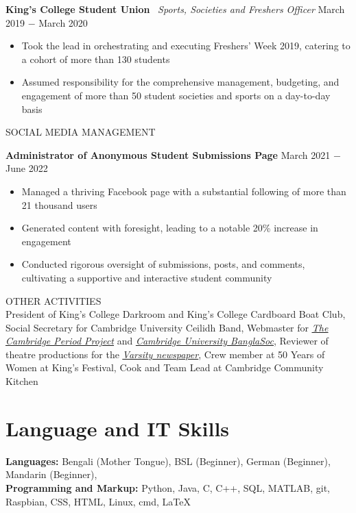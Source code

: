 \documentclass{article}
\begin{document}
\textbf{King's College Student Union} \
\textit{Sports, Societies and Freshers Officer }\hfill March 2019 $-$ March 2020
\begin{itemize}
    \item Took the lead in orchestrating and executing Freshers' Week 2019, catering to a cohort of more than 130 students
    \item Assumed responsibility for the comprehensive management, budgeting, and engagement of more than 50 student societies and sports on a day-to-day basis
\end{itemize} \medskip

\uppercase{Social Media Management}

\textbf{Administrator of Anonymous Student Submissions Page} \hfill March 2021 $-$ June 2022
\begin{itemize}
    \item Managed a thriving Facebook page with a substantial following of more than 21 thousand users
    \item Generated content with foresight, leading to a notable 20\% increase in engagement
    \item Conducted rigorous oversight of submissions, posts, and comments, cultivating a supportive and interactive student community
\end{itemize} \medskip

\uppercase{Other Activities}\\
President of King's College Darkroom and King's College Cardboard Boat Club, Social Secretary for Cambridge University Ceilidh Band, Webmaster for \href{http://tcpp.soc.srcf.net/}{\underline{\textit{The Cambridge Period Project}}} and \href{https://cambridgebanglasoc.org/}{\underline{\textit{Cambridge University BanglaSoc}}}, Reviewer of theatre productions for the \href{https://www.varsity.co.uk/profile/sheamol-obeda}{\underline{\textit{Varsity newspaper}}}, Crew member at 50 Years of Women at King's Festival, Cook and Team Lead at Cambridge Community Kitchen

\medskip

\vspace{-.75\baselineskip}
\hrulefill
\vspace{-.75\baselineskip}

\section*{Language and IT Skills}
\textbf{Languages:} Bengali (Mother Tongue), 
BSL (Beginner), German (Beginner), Mandarin (Beginner),  \\
\textbf{Programming and Markup:} Python, Java, C, C++, SQL, MATLAB, git, Raspbian, CSS, HTML, Linux, cmd, \LaTeX\medskip
\end{document}
